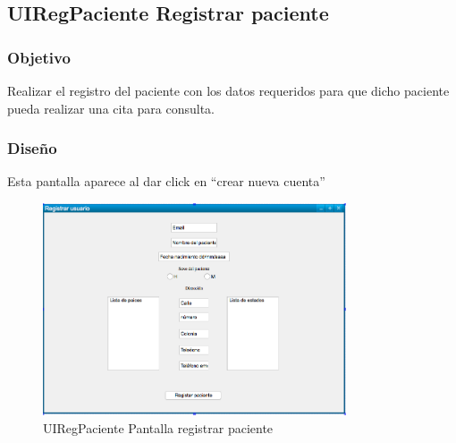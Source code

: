     \subsection{UIRegPaciente Registrar paciente}

\subsubsection{Objetivo}
    Realizar el registro del paciente con los datos requeridos para que dicho paciente pueda realizar una cita para consulta. 

\subsubsection{Diseño}
    Esta pantalla aparece al dar click en ``crear nueva cuenta''

\begin{figure}[htbp!]
        \centering
            \includegraphics[width=0.8\textwidth]{images/UIRegPaciente}
        \caption{UIRegPaciente Pantalla registrar paciente}
    \end{figure}


